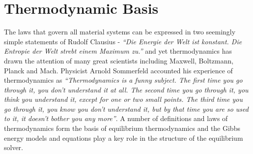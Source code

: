 \chapter{Thermodynamic Basis} \label{chap:thermo}

The laws that govern all material systems can be expressed in two seemingly simple statements of Rudolf Clausius - \emph{``Die Energie der Welt ist konstant. Die Entropie der Welt strebt einem Maximum zu.''}   and yet thermodynamics has drawn the attention of many great scientists including Maxwell, Boltzmann, Planck and  Mach. Physicist Arnold Sommerfeld accounted his experience of thermodynamics as \emph{``Thermodynamics is a funny subject. The first time you go through it, you don't understand it at all. The second time you go through it, you think you understand it, except for one or two small points. The third time you go through it, you know you don't understand it, but by that time you are so used to it, it doesn't bother you any more''}. A number of definitions and laws of thermodynamics form the basis of equilibrium thermodynamics and the Gibbs energy models and equations play a key role in the structure of the equilibrium solver.

%

